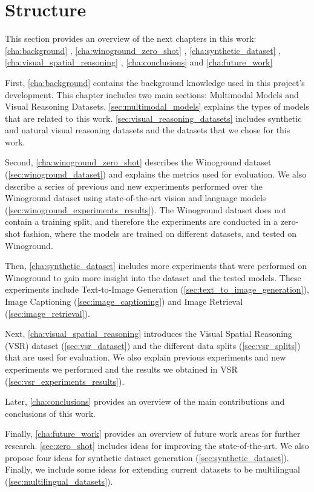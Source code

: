 \section{Structure} \label{sec:structure}

This section provides an overview of the next chapters in this work: \ref{cha:background} , \ref{cha:winoground_zero_shot} , \ref{cha:synthetic_dataset} , \ref{cha:visual_spatial_reasoning} , \ref{cha:conclusions}  and \ref{cha:future_work} 

First, \cref{cha:background} contains the background knowledge used in this project's development. This chapter includes two main sections: Multimodal Models and Visual Reasoning Datasets. \cref{sec:multimodal_models} explains the types of models that are related to this work. \cref{sec:visual_reasoning_datasets} includes synthetic and natural visual reasoning datasets and the datasets that we chose for this work.

Second, \cref{cha:winoground_zero_shot} describes the Winoground \cite{thrush2022winoground} dataset (\cref{sec:winoground_dataset}) and explains the metrics used for evaluation. We also describe a series of previous and new experiments performed over the Winoground dataset using state-of-the-art vision and language models (\cref{sec:winoground_experiments_results}). The Winoground dataset does not contain a training split, and therefore the experiments are conducted in a zero-shot fashion, where the models are trained on different datasets, and tested on Winoground.

Then, \cref{cha:synthetic_dataset} includes more experiments that were performed on Winoground to gain more insight into the dataset and the tested models. These experiments include Text-to-Image Generation (\ref{sec:text_to_image_generation}), Image Captioning (\ref{sec:image_captioning}) and Image Retrieval (\ref{sec:image_retrieval}).

Next, \cref{cha:visual_spatial_reasoning} introduces the Visual Spatial Reasoning (VSR) \cite{liu2022visual} dataset (\cref{sec:vsr_dataset}) and the different data splits (\cref{sec:vsr_splits}) that are used for evaluation. We also explain previous experiments and new experiments we performed and the results we obtained in VSR (\cref{sec:vsr_experiments_results}).

Later, \cref{cha:conclusions} provides an overview of the main contributions and conclusions of this work.

Finally, \cref{cha:future_work} provides an overview of future work areas for further research. \cref{sec:zero_shot} includes ideas for improving the state-of-the-art. We also propose four ideas for synthetic dataset generation (\cref{sec:synthetic_dataset}). Finally, we include some ideas for extending current datasets to be multilingual (\cref{sec:multilingual_datasets}).